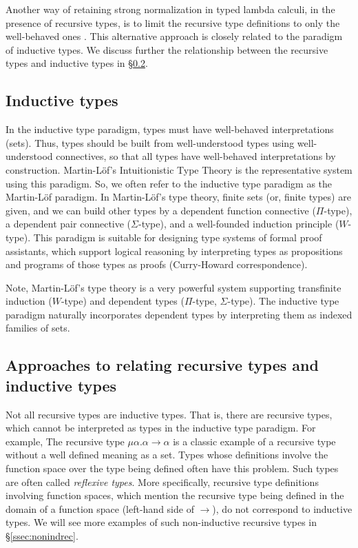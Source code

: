 Another way of retaining strong normalization in typed lambda calculi,
in the presence of recursive types, is to limit the recursive type definitions
to only the well-behaved ones \cite{Mat98,Mat99,Mat01}.
This alternative approach is closely related to the paradigm of inductive types.
We discuss further the relationship between the recursive types and
inductive types in \S\ref{ssec:recVSind}.

\subsection{Inductive types}\label{ssec:indtype}

In the inductive type paradigm, types must have well-behaved interpretations
(\ie sets). Thus, types should be built from well-understood types using
well-understood connectives, so that all types have well-behaved
interpretations by construction. Martin-L\"of's Intuitionistic Type Theory
\cite{Mar84itt} is the representative system using this paradigm. So, we
often refer to the inductive type paradigm as the Martin-L\"of paradigm.
In Martin-L\"of's type theory, finite sets (or, finite types) are given,
and we can build other types by a dependent function connective ($\Pi$-type),
a dependent pair connective ($\Sigma$-type), and a well-founded induction
principle ($W$-type). This paradigm is suitable for designing type systems
of formal proof assistants, which support logical reasoning by interpreting
types as propositions and programs of those types as proofs (\aka Curry-Howard
correspondence).

Note, Martin-L\"of's type theory \cite{Mar84itt} is a very powerful system
supporting transfinite induction ($W$-type) and dependent types ($\Pi$-type,
$\Sigma$-type). The inductive type paradigm naturally incorporates
dependent types by interpreting them as indexed families of sets.

\subsection{Approaches to relating recursive types and inductive types}
\label{ssec:recVSind}

Not all recursive types are inductive types. That is, there are recursive types,
which cannot be interpreted as types in the inductive type paradigm.
For example, The recursive type $\mu \alpha . \alpha \to \alpha$ is
a classic example of a recursive type without a well defined meaning as a set.
Types whose definitions involve the function space over the type being defined
often have this problem. Such types are often called \emph{reflexive types}.
More specifically, recursive type definitions involving function spaces, which
mention the recursive type being defined in the domain of a function space
(\ie left-hand side of $\to$), do not correspond to inductive types. We will see
more examples of such non-inductive recursive types in \S\ref{ssec:nonindrec}.

